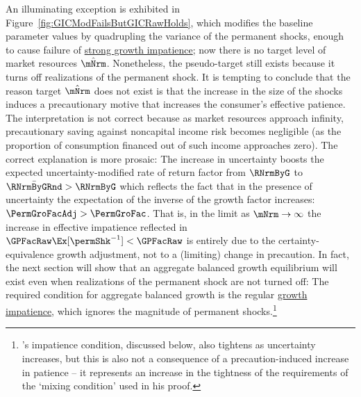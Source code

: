 \documentclass[BufferStockTheory]{subfiles}
\begin{document}
\renewcommand{\figFile}{GICModFailsButGICRawHolds}
\hypertarget{\figFile}{}


An illuminating exception is exhibited in Figure~\ref{fig:GICModFailsButGICRawHolds}, which modifies the baseline parameter values by quadrupling the variance of the permanent shocks, enough to cause failure of \hyperlink{GICMod}{strong growth impatience}; now there is no target level of market resources $\mTrgNrm$.
Nonetheless, the pseudo-target still exists because it turns off realizations of the permanent shock.
It is tempting to conclude that the reason target $\mTrgNrm$ does not exist is that the increase in the size of the shocks induces a precautionary motive that increases the consumer's effective patience.
The interpretation is not correct because as market resources approach infinity, precautionary saving against noncapital income risk becomes negligible (as the proportion of consumption financed out of such income approaches zero).
The correct explanation is more prosaic: The increase in uncertainty boosts the expected uncertainty-modified rate of return factor from $\RNrmByG$ to $\bar{\RNrmByGRnd}>\RNrmByG$ which reflects the fact that in the presence of uncertainty the expectation of the inverse of the growth factor increases: $\PermGroFacAdj > \PermGroFac$.
That is, in the limit as $\mNrm \rightarrow \infty$ the increase in effective impatience reflected in $\GPFacMod < \GPFacRaw$ is entirely due to the certainty-equivalence growth adjustment, not to a (limiting) change in precaution.
In fact, the next section will show that an aggregate balanced growth equilibrium will exist even when realizations of the permanent shock are not turned off: The required condition for aggregate balanced growth is the regular \hyperlink{GIC}{growth impatience}, which ignores the magnitude of permanent shocks.\footnote{\cite{szeidlInvariant}'s impatience condition, discussed below, also tightens as uncertainty increases, but this is also not a consequence of a precaution-induced increase in patience -- it represents an increase in the tightness of the requirements of the `mixing condition' used in his proof.}
\end{document}
